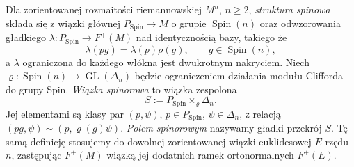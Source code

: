 \begin{definicja}
\label{def:lin31-struktura-spinowa}
Dla zorientowanej rozmaitości riemannowskiej
$M^n$, $n\geq2$, \emph{struktura spinowa}
składa się z wiązki głównej
$P_{\mathrm{Spin}}\to M$ o grupie
$\operatorname{Spin}(n)$ oraz odwzorowania
gładkiego $\lambda:P_{\mathrm{Spin}}\to F^+(M)$
nad identycznością bazy, takiego że
\[
 \lambda(pg)=\lambda(p)\rho(g),
 \qquad g\in\operatorname{Spin}(n),
\]
a $\lambda$ ograniczona do każdego włókna
jest dwukrotnym nakryciem.
Niech $\varrho:\operatorname{Spin}(n)\to\operatorname{GL}(\Delta_n)$
będzie ograniczeniem działania modułu Clifforda do grupy Spin.
\emph{Wiązka spinorowa} to wiązka zespolona
\[
 S:=P_{\mathrm{Spin}}\times_{\varrho}\Delta_n.
\]
Jej elementami są klasy par $(p,\psi)$,
$p\in P_{\mathrm{Spin}}$, $\psi\in\Delta_n$,
z relacją $(pg,\psi)\sim(p,\varrho(g)\psi)$.
\emph{Polem spinorowym} nazywamy gładki przekrój $S$.
Tę samą definicję stosujemy do dowolnej zorientowanej wiązki
euklidesowej $E$ rzędu $n$, zastępując $F^+(M)$ wiązką jej
dodatnich ramek ortonormalnych $F^+(E)$.
\end{definicja}


